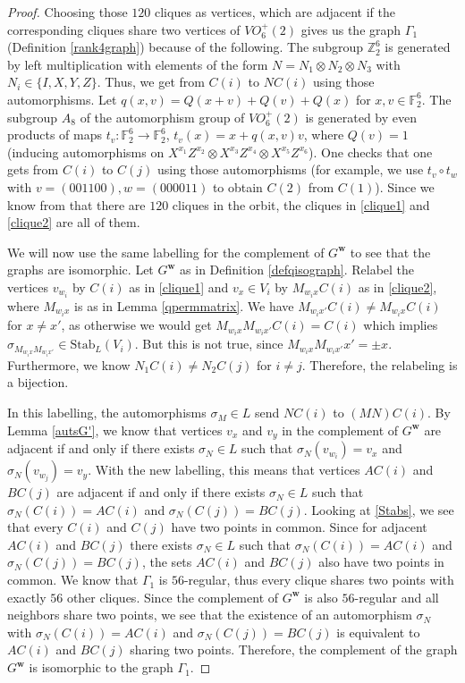 \documentclass[11pt]{article}
\theoremstyle{definition}
\numberwithin{equation}{section}
\newcommand{\Z}{\mathbb{Z}}
\newcommand{\F}{\mathbb{F}}
\begin{document}
\begin{proof}
Choosing those $120$ cliques as vertices, which are adjacent if the corresponding cliques share two vertices of $VO_6^+(2)$ gives us the graph $\Gamma_1$ (Definition \ref{rank4graph}) because of the following. The subgroup $\Z_2^6$ is generated by left multiplication with elements of the form $N=N_1\otimes N_2 \otimes N_3$ with $N_i\in \{I,X,Y,Z\}$. Thus, we get from $C(i)$ to $NC(i)$ using those automorphisms. Let $q(x,v)=Q(x+v)+Q(v)+Q(x)$ for $x,v \in \F_2^6$. The subgroup $A_8$ of the automorphism group of $VO_6^+(2)$ is generated by even products of maps $t_v:\F_2^6\to \F_2^6$, $t_v(x)=x+q(x,v)v$, where $Q(v)=1$ (inducing automorphisms on $X^{x_1}Z^{x_2}\otimes X^{x_3}Z^{x_4}\otimes X^{x_5}Z^{x_6}$). One checks that one gets from $C(i)$ to $C(j)$ using those automorphisms (for example, we use $t_v\circ t_w$ with $v=(001100), w=(000011)$ to obtain $C(2)$ from $C(1)$). Since we know from \cite{BIK} that there are $120$ cliques in the orbit, the cliques in \eqref{clique1} and \eqref{clique2} are all of them. 

We will now use the same labelling for the complement of $G^{\boldsymbol{w}}$ to see that the graphs are isomorphic. Let $G^{\boldsymbol{w}}$ as in Definition \ref{defqisograph}. Relabel the vertices $v_{w_i}$ by $C(i)$ as in \eqref{clique1} and $v_x\in V_i$ by $M_{w_ix}C(i)$ as in \eqref{clique2}, where $M_{w_ix}$ is as in Lemma \ref{qpermmatrix}. We have $M_{w_ix'}C(i)\neq M_{w_ix}C(i)$ for $x\neq x'$, as otherwise we would get $M_{w_ix}M_{w_ix'}C(i)=C(i)$ which implies $\sigma_{M_{w_ix}M_{w_ix'}}\in \mathrm{Stab}_L(V_i)$. But this is not true, since $M_{w_ix}M_{w_ix'}x'=\pm x$. Furthermore, we know $N_1C(i)\neq N_2C(j)$ for $i\neq j$. Therefore, the relabeling is a bijection. 

In this labelling, the automorphisms $\sigma_M\in L$ send $NC(i)$ to $(MN)C(i)$. By Lemma \ref{autsG'}, we know that vertices $v_x$ and $v_y$ in the complement of $G^{\boldsymbol{w}}$ are adjacent if and only if there exists $\sigma_N\in L$ such that $\sigma_N(v_{w_i})=v_x$ and $\sigma_N(v_{w_j})=v_y$. With the new labelling, this means that vertices $AC(i)$ and $BC(j)$ are adjacent if and only if there exists $\sigma_N\in L$ such that $\sigma_N(C(i))=AC(i)$ and $\sigma_N(C(j))=BC(j)$. Looking at \eqref{Stabs}, we see that every $C(i)$ and $C(j)$ have two points in common. Since for adjacent $AC(i)$ and $BC(j)$ there exists $\sigma_N \in L$ such that $\sigma_N(C(i))=AC(i)$ and $\sigma_N(C(j))=BC(j)$, the sets $AC(i)$ and $BC(j)$ also have two points in common. We know that $\Gamma_1$ is $56$-regular, thus every clique shares two points with exactly $56$ other cliques. Since the complement of $G^{\boldsymbol{w}}$ is also $56$-regular and all neighbors share two points, we see that the existence of an automorphism $\sigma_N$ with $\sigma_N(C(i))=AC(i)$ and $\sigma_N(C(j))=BC(j)$ is equivalent to $AC(i)$ and $BC(j)$ sharing two points. Therefore, the complement of the graph $G^{\boldsymbol{w}}$ is isomorphic to the graph $\Gamma_1$. 
\end{proof}
\end{document}
